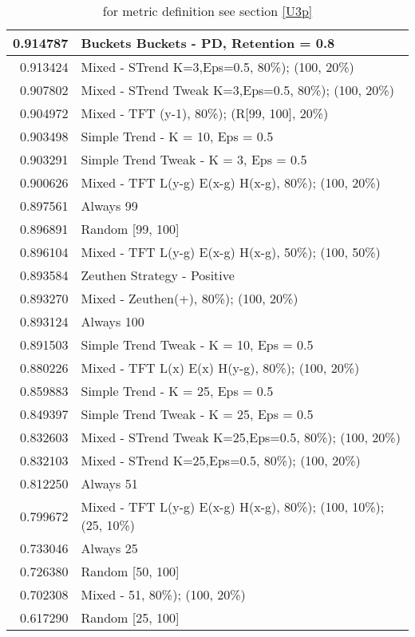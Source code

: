\begin{table}[!hbtp]
\begin{footnotesize}
\begin{tabular}{|r|l|}
0.914787 & Buckets Buckets - PD, Retention = 0.8\\ \hline
0.913424 & Mixed - {STrend K=3,Eps=0.5, 80\%); (100, 20\%)}\\ \hline
0.907802 & Mixed - {STrend Tweak K=3,Eps=0.5, 80\%); (100, 20\%)}\\ \hline
0.904972 & Mixed - {TFT (y-1), 80\%); (R[99, 100], 20\%)}\\ \hline
0.903498 & Simple Trend - K = 10, Eps = 0.5\\ \hline
0.903291 & Simple Trend Tweak - K = 3, Eps = 0.5\\ \hline
0.900626 & Mixed - {TFT L(y-g) E(x-g) H(x-g), 80\%); (100, 20\%)}\\ \hline
0.897561 & Always 99\\ \hline
0.896891 & Random [99, 100]\\ \hline
0.896104 & Mixed - {TFT L(y-g) E(x-g) H(x-g), 50\%); (100, 50\%)}\\ \hline
0.893584 & Zeuthen Strategy - Positive\\ \hline
0.893270 & Mixed - {Zeuthen(+), 80\%); (100, 20\%)}\\ \hline
0.893124 & Always 100\\ \hline
0.891503 & Simple Trend Tweak - K = 10, Eps = 0.5\\ \hline
0.880226 & Mixed - {TFT L(x) E(x) H(y-g), 80\%); (100, 20\%)}\\ \hline
0.859883 & Simple Trend - K = 25, Eps = 0.5\\ \hline
0.849397 & Simple Trend Tweak - K = 25, Eps = 0.5\\ \hline
0.832603 & Mixed - {STrend Tweak K=25,Eps=0.5, 80\%); (100, 20\%)}\\ \hline
0.832103 & Mixed - {STrend K=25,Eps=0.5, 80\%); (100, 20\%)}\\ \hline
0.812250 & Always 51\\ \hline
0.799672 & Mixed - {TFT L(y-g) E(x-g) H(x-g), 80\%); (100, 10\%); (25, 10\%)}\\ \hline
0.733046 & Always 25\\ \hline
0.726380 & Random [50, 100]\\ \hline
0.702308 & Mixed - {51, 80\%); (100, 20\%)}\\ \hline
0.617290 & Random [25, 100]\\ \hline
\end{tabular}
\caption{for metric definition see section \eqref{U3p}}
\end{footnotesize}
\end{table}


